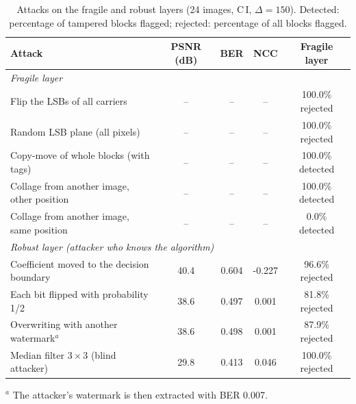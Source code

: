 \begin{table}[t]
\centering
\caption{Attacks on the fragile and robust layers (24 images, C\,I, $\Delta=150$). Detected: percentage of tampered blocks flagged; rejected: percentage of all blocks flagged.}
\label{tab:security_attacks}
\footnotesize
\setlength{\tabcolsep}{3pt}
\begin{tabular}{lcccc}
\toprule
Attack & PSNR (dB) & BER & NCC & Fragile layer \\
\midrule
\multicolumn{5}{l}{\emph{Fragile layer}} \\
Flip the LSBs of all carriers & -- & -- & -- & 100.0\% rejected \\
Random LSB plane (all pixels) & -- & -- & -- & 100.0\% rejected \\
Copy-move of whole blocks (with tags) & -- & -- & -- & 100.0\% detected \\
Collage from another image, other position & -- & -- & -- & 100.0\% detected \\
Collage from another image, same position & -- & -- & -- & 0.0\% detected \\
\midrule
\multicolumn{5}{l}{\emph{Robust layer (attacker who knows the algorithm)}} \\
Coefficient moved to the decision boundary & 40.4 & 0.604 & -0.227 & 96.6\% rejected \\
Each bit flipped with probability 1/2 & 38.6 & 0.497 & 0.001 & 81.8\% rejected \\
Overwriting with another watermark$^{a}$ & 38.6 & 0.498 & 0.001 & 87.9\% rejected \\
Median filter $3\times3$ (blind attacker) & 29.8 & 0.413 & 0.046 & 100.0\% rejected \\
\bottomrule
\end{tabular}
\par\smallskip\raggedright $^{a}$ The attacker's watermark is then extracted with BER 0.007.
\end{table}
